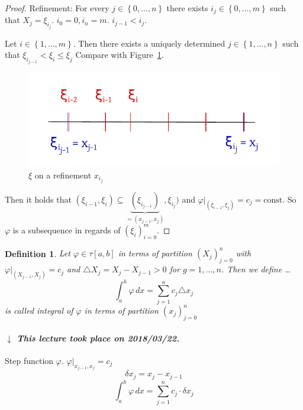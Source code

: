 \documentclass{article}
\newtheorem{definition}{Definition}  \numberwithin{definition}{section}
\newcommand{\set}[1]{\left\{#1\right\}}
\newcommand{\dateref}[1]{%
  \begin{mdframed}[backgroundcolor=gray!10,innerbottommargin=0pt,innertopmargin=0pt]
    \paragraph{\textit{$\downarrow$ This lecture took place on #1.}}%
  \end{mdframed}%
}
\begin{document}
\begin{proof}
  Refinement: For every $j \in \set{0,\dots,n}$ there exists $i_j \in \set{0,\dots,m}$ such that $X_j = \xi_{i_j}$.
  $i_0 = 0, i_n = m$. $i_{j-1} < i_j$.

  Let $i \in \set{1, \dots, m}$. Then there exists a uniquely determined $j \in \set{1, \dots, n}$ such that $\xi_{i_{j-1}} < \xi_i \leq \xi_j$
  Compare with Figure~\ref{img:xi}.

  \begin{figure}[t]
    \begin{center}
      \includegraphics{img/11_xi.pdf}
      \caption{$\xi$ on a refinement $x_{i_j}$}
      \label{img:xi}
    \end{center}
  \end{figure}

  Then it holds that $(\xi_{i-1}, \xi_i) \subseteq \underbrace{(\xi_{i_{j-1}})}_{= (x_{j-1}, x_j)}, \xi_{i_j})$ and $\varphi|_{(\xi_{i-1}, \xi_j)} = c_j = \text{const}$. So $\varphi$ is a subsequence in regards of $(\xi_i)_{i=0}^m$.
\end{proof}

\begin{definition}
  Let $\varphi \in \tau[a,b]$ in terms of partition $(X_j)_{j=0}^n$ with $\varphi|_{(X_{j-1}, X_j)} = c_j$ and $\triangle X_j = X_j - X_{j-1} > 0$ for $g = 1,\dots,n$. Then we define \dots
  \[ \int_a^b \varphi \, dx = \sum_{j=1}^n c_j \triangle x_j \]
  is called \emph{integral of $\varphi$} in terms of partition $(x_j)_{j=0}^n$
\end{definition}

\dateref{2018/03/22}

Step function $\varphi$. $\varphi|_{x_{j-1},x_j} = c_j$
\[ \delta x_j = x_j - x_{j-1} \]
\[ \int_a^b \varphi \, dx = \sum_{j=1}^n c_j \cdot \delta x_j \]
\end{document}
